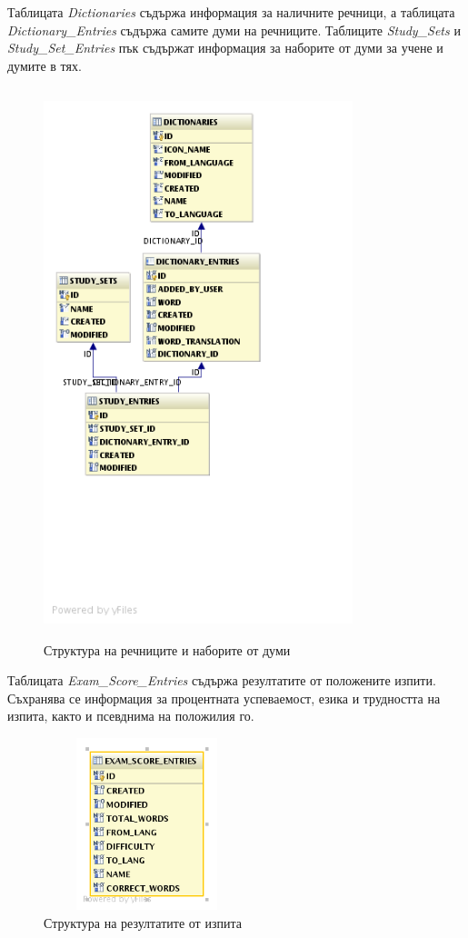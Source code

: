 Таблицата \emph{Dictionaries} съдържа информация за наличните речници,
а таблицата \emph{Dictionary\_Entries} съдържа самите думи на
речниците. Таблиците \emph{Study\_Sets} и \emph{Study\_Set\_Entries} пък
съдържат информация за наборите от думи за учене и думите в тях. 

\begin{figure}[htbp]
  \caption{Структура на речниците и наборите от думи}
  \centering
  \includegraphics[width=90mm, height=160mm]{images/db_diagram.png}
\end{figure}

Таблицата \emph{Exam\_Score\_Entries} съдържа резултатите от положените
изпити. Съхранява се информация за процентната успеваемост, езика и
трудността на изпита, както и псевднима на положилия го.

\begin{figure}[htbp]
  \caption{Структура на резултатите от изпита}
  \centering
  \includegraphics[width=60mm, height=50mm]{images/exam_score_entries_diagram.png}
\end{figure}

